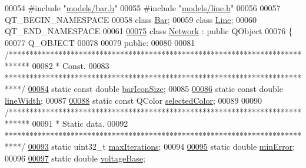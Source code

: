 \begin{DoxyCode}
00054 \textcolor{preprocessor}{#include "\hyperlink{bar_8h}{models/bar.h}"}
00055 \textcolor{preprocessor}{#include "\hyperlink{line_8h}{models/line.h}"}
00056 
00057 QT\_BEGIN\_NAMESPACE
00058 \textcolor{keyword}{class }\hyperlink{class_bar}{Bar};
00059 \textcolor{keyword}{class }\hyperlink{class_line}{Line};
00060 QT\_END\_NAMESPACE
00061 
\hypertarget{network_8h_source_l00075}{}\hyperlink{class_network}{00075} \textcolor{keyword}{class }\hyperlink{class_network}{Network} : \textcolor{keyword}{public} QObject
00076 \{
00077   Q\_OBJECT
00078 
00079 \textcolor{keyword}{public}:
00080 
00081   \textcolor{comment}{/*****************************************************************************}
00082 \textcolor{comment}{   * Const.}
00083 \textcolor{comment}{   ****************************************************************************/}
\hypertarget{network_8h_source_l00084}{}\hyperlink{group___graphics_gaa334bbc93b3fde219840e95e23198b53}{00084}   \textcolor{keyword}{static} \textcolor{keyword}{const} \textcolor{keywordtype}{double} \hyperlink{group___graphics_gaa334bbc93b3fde219840e95e23198b53}{barIconSize};
00085 
\hypertarget{network_8h_source_l00086}{}\hyperlink{group___graphics_ga3f810634c9908d62d33a1ab09a76c147}{00086}   \textcolor{keyword}{static} \textcolor{keyword}{const} \textcolor{keywordtype}{double} \hyperlink{group___graphics_ga3f810634c9908d62d33a1ab09a76c147}{lineWidth};
00087 
\hypertarget{network_8h_source_l00088}{}\hyperlink{group___graphics_gaa9e21b8e2a24b0495e776a51e1aeed94}{00088}   \textcolor{keyword}{static} \textcolor{keyword}{const} QColor \hyperlink{group___graphics_gaa9e21b8e2a24b0495e776a51e1aeed94}{selectedColor};
00089 
00090   \textcolor{comment}{/*****************************************************************************}
00091 \textcolor{comment}{   * Static data.}
00092 \textcolor{comment}{   ****************************************************************************/}
\hypertarget{network_8h_source_l00093}{}\hyperlink{group___graphics_ga318dee060bc577eacd67d332efbbe1b2}{00093}   \textcolor{keyword}{static} uint32\_t \hyperlink{group___graphics_ga318dee060bc577eacd67d332efbbe1b2}{maxIterations};
00094 
\hypertarget{network_8h_source_l00095}{}\hyperlink{group___graphics_gabcdc973129d3dda7572b7a1c388da1b5}{00095}   \textcolor{keyword}{static} \textcolor{keywordtype}{double} \hyperlink{group___graphics_gabcdc973129d3dda7572b7a1c388da1b5}{minError};
00096 
\hypertarget{network_8h_source_l00097}{}\hyperlink{group___graphics_ga7c1e79d9ac69df9a69f24eaf092fd5e5}{00097}   \textcolor{keyword}{static} \textcolor{keywordtype}{double} \hyperlink{group___graphics_ga7c1e79d9ac69df9a69f24eaf092fd5e5}{voltageBase};

\end{DoxyCode}
